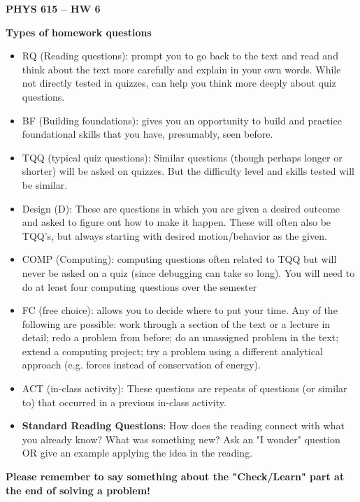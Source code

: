 \documentclass[12pt]{article}
\newcommand{\shortlist}{%
\parindent 0in%
\parskip   0in%
\itemsep   0in%
\topsep    0in%
\parsep    0in%
}
\newcommand{\Title}{PHYS 615 -- HW 6}
\begin{document}
\begin{center}
    {\Large\bfseries\Title}

\end{center}
\bigskip
\bigskip

\textbf{Types of homework questions}
\begin{itemize}\shortlist
    \item	RQ (Reading questions):  prompt you to go back to the text and read and think about the text more carefully and explain in your own words. While not directly tested in quizzes, can help you think more deeply about quiz questions.
    \item	BF (Building foundations):  gives you an opportunity to build and practice foundational skills that you have, presumably, seen before.
    \item	TQQ (typical quiz questions):   Similar questions (though perhaps longer or shorter) will be asked on quizzes.  But the difficulty level and skills tested will be similar.
    \item Design (D):  These are questions in which you are given a desired outcome and asked to figure out how to make it happen.  These will often also be TQQ’s, but always starting with desired motion/behavior as the given.
    \item	COMP (Computing): computing questions often related to TQQ but will never be asked on a quiz (since debugging can take so long).  You will need to do at least four computing questions over the semester
    \item	FC (free choice): allows you to decide where to put your time.  Any of the following are possible:  work through a section of the text or a lecture in detail; redo a problem from before; do an unassigned problem in the text; extend a computing project; try a problem using a different analytical approach (e.g. forces instead of conservation of energy).
    \item ACT (in-class activity): These questions are repeats of questions (or similar to) that occurred in a previous in-class activity.
    \item \textbf{Standard Reading Questions}: How does the reading connect with what you already know? What was something new?  Ask an "I wonder" question OR give an example applying the idea in the reading.
\end{itemize}

\textbf{Please remember to say something about the "Check/Learn" part at the end of solving a problem!}
\end{document}
